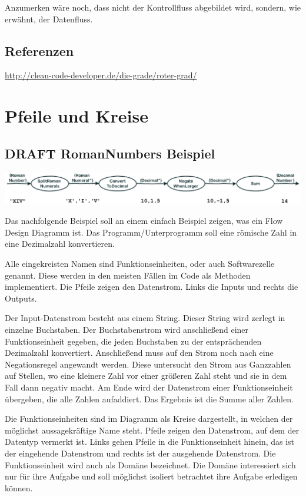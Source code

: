 \documentclass[11pt]{article}
\begin{document}
Anzumerken wäre noch, dass nicht der Kontrollfluss abgebildet wird, sondern, wie erwähnt, der Datenfluss.
\subsection{Referenzen}
\label{sec:orgheadline15}

\url{http://clean-code-developer.de/die-grade/roter-grad/}

\section{Pfeile und Kreise}
\label{sec:orgheadline19}
\subsection{{\bfseries\sffamily DRAFT} RomanNumbers Beispiel}
\label{sec:orgheadline17}

\includegraphics[width=.9\linewidth]{./img/FromRomanNumerals.png}

Das nachfolgende Beispiel soll an einem einfach Beispiel zeigen, was ein Flow Design Diagramm ist.
Das Programm/Unterprogramm soll eine römische Zahl in eine Dezimalzahl konvertieren.

Alle eingekreisten Namen sind Funktionseinheiten, oder auch Softwarezelle genannt.
Diese werden in den meisten Fällen im Code als Methoden implementiert.
Die Pfeile zeigen den Datenstrom. Links die Inputs und rechts die Outputs.


Der Input-Datenstrom besteht aus einem String. Dieser String wird zerlegt in einzelne Buchstaben.
Der Buchstabenstrom wird anschließend einer Funktionseinheit gegeben, die jeden Buchstaben zu der entsprächenden 
Dezimalzahl konvertiert. Anschließend muss auf den Strom noch nach eine Negationsregel angewandt werden. Diese untersucht den
Strom aus Ganzzahlen auf Stellen, wo eine kleinere Zahl vor einer größeren Zahl steht und sie in dem Fall dann negativ macht.
Am Ende wird der Datenstrom einer Funktionseinheit übergeben, die alle Zahlen aufaddiert.
Das Ergebnis ist die Summe aller Zahlen. 

Die Funktionseinheiten sind im Diagramm als Kreise dargestellt, in welchen der möglichst aussagekräftige Name steht.
Pfeile zeigen den Datenstrom, auf dem der Datentyp vermerkt ist.
Links gehen Pfeile in die Funktionseinheit hinein, das ist der eingehende Datenstrom und rechts ist der ausgehende Datenstrom.
Die Funktionseinheit wird auch als Domäne bezeichnet. Die Domäne interessiert sich nur für ihre Aufgabe und soll möglichst isoliert
betrachtet ihre Aufgabe erledigen können.
\end{document}

